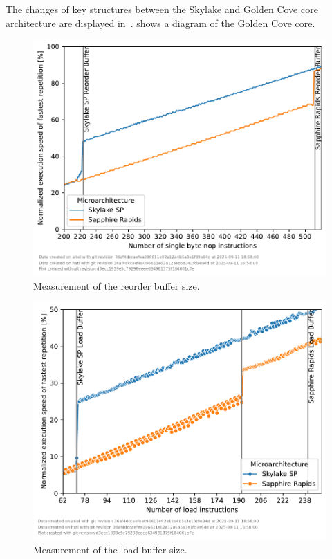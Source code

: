 The changes of key structures between the Skylake and Golden Cove core architecture are displayed in~.
 shows a diagram of the Golden Cove core.

\begin{figure}[]
    \centering
    \includegraphics[width=0.8\columnwidth]{fig/robsize/reorder-buffer.pdf}
    \caption{\label{fig:robsize-reorder}Measurement of the reorder buffer size.}
\end{figure}
\begin{figure}[]
    \centering
    \includegraphics[width=0.8\columnwidth]{fig/robsize/load-buffer.pdf}
    \caption{\label{fig:robsize-load}Measurement of the load buffer size.}
\end{figure}

